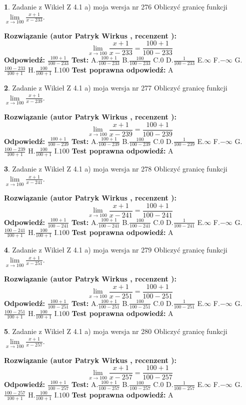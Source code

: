 \documentclass[12pt, a4paper]{article}
\theoremstyle{definition} %
\newtheorem{zad}{}
\newcommand{\zadStart}[1]{\begin{zad}#1\newline}
\newcommand{\zadStop}{\end{zad}}
\newcommand{\rozwStart}[2]{\noindent \textbf{Rozwiązanie (autor #1 , recenzent #2): }\newline}
\newcommand{\rozwStop}{\newline}
\newcommand{\odpStart}{\noindent \textbf{Odpowiedź:}\newline}
\newcommand{\odpStop}{\newline}
\newcommand{\testStart}{\noindent \textbf{Test:}\newline}
\newcommand{\testStop}{\newline}
\newcommand{\kluczStart}{\noindent \textbf{Test poprawna odpowiedź:}\newline}
\newcommand{\kluczStop}{\newline}
\begin{document}
\zadStart{Zadanie z Wikieł Z 4.1 a) moja wersja nr 276}
Obliczyć granicę funkcji $\lim\limits_{x\to100}\frac{x+1}{x-233}$.
\zadStop
\rozwStart{Patryk Wirkus}{}
$$\lim\limits_{x\to100}\frac{x+1}{x-233} = \frac{100+1}{100-233}$$
\rozwStop
\odpStart
$\frac{100+1}{100-233}$
\odpStop
\testStart
A.$\frac{100+1}{100-233}$
B.$\frac{100}{100-233}$
C.$0$
D.$\frac{1}{100-233}$
E.$\infty$
F.$-\infty$
G.$\frac{100-233}{100+1}$
H.$\frac{100}{100+1}$
I.$100$
\testStop
\kluczStart
A
\kluczStop



\zadStart{Zadanie z Wikieł Z 4.1 a) moja wersja nr 277}
Obliczyć granicę funkcji $\lim\limits_{x\to100}\frac{x+1}{x-239}$.
\zadStop
\rozwStart{Patryk Wirkus}{}
$$\lim\limits_{x\to100}\frac{x+1}{x-239} = \frac{100+1}{100-239}$$
\rozwStop
\odpStart
$\frac{100+1}{100-239}$
\odpStop
\testStart
A.$\frac{100+1}{100-239}$
B.$\frac{100}{100-239}$
C.$0$
D.$\frac{1}{100-239}$
E.$\infty$
F.$-\infty$
G.$\frac{100-239}{100+1}$
H.$\frac{100}{100+1}$
I.$100$
\testStop
\kluczStart
A
\kluczStop



\zadStart{Zadanie z Wikieł Z 4.1 a) moja wersja nr 278}
Obliczyć granicę funkcji $\lim\limits_{x\to100}\frac{x+1}{x-241}$.
\zadStop
\rozwStart{Patryk Wirkus}{}
$$\lim\limits_{x\to100}\frac{x+1}{x-241} = \frac{100+1}{100-241}$$
\rozwStop
\odpStart
$\frac{100+1}{100-241}$
\odpStop
\testStart
A.$\frac{100+1}{100-241}$
B.$\frac{100}{100-241}$
C.$0$
D.$\frac{1}{100-241}$
E.$\infty$
F.$-\infty$
G.$\frac{100-241}{100+1}$
H.$\frac{100}{100+1}$
I.$100$
\testStop
\kluczStart
A
\kluczStop



\zadStart{Zadanie z Wikieł Z 4.1 a) moja wersja nr 279}
Obliczyć granicę funkcji $\lim\limits_{x\to100}\frac{x+1}{x-251}$.
\zadStop
\rozwStart{Patryk Wirkus}{}
$$\lim\limits_{x\to100}\frac{x+1}{x-251} = \frac{100+1}{100-251}$$
\rozwStop
\odpStart
$\frac{100+1}{100-251}$
\odpStop
\testStart
A.$\frac{100+1}{100-251}$
B.$\frac{100}{100-251}$
C.$0$
D.$\frac{1}{100-251}$
E.$\infty$
F.$-\infty$
G.$\frac{100-251}{100+1}$
H.$\frac{100}{100+1}$
I.$100$
\testStop
\kluczStart
A
\kluczStop



\zadStart{Zadanie z Wikieł Z 4.1 a) moja wersja nr 280}
Obliczyć granicę funkcji $\lim\limits_{x\to100}\frac{x+1}{x-257}$.
\zadStop
\rozwStart{Patryk Wirkus}{}
$$\lim\limits_{x\to100}\frac{x+1}{x-257} = \frac{100+1}{100-257}$$
\rozwStop
\odpStart
$\frac{100+1}{100-257}$
\odpStop
\testStart
A.$\frac{100+1}{100-257}$
B.$\frac{100}{100-257}$
C.$0$
D.$\frac{1}{100-257}$
E.$\infty$
F.$-\infty$
G.$\frac{100-257}{100+1}$
H.$\frac{100}{100+1}$
I.$100$
\testStop
\kluczStart
A
\kluczStop
\end{document}

